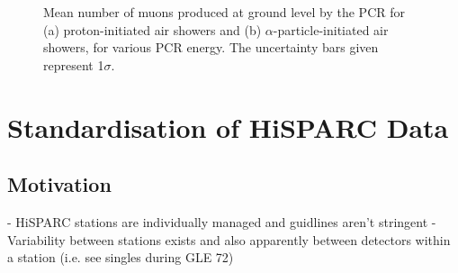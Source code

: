 \begin{figure}
	\centering
	\qquad
	\caption{Mean number of muons produced at ground level by the PCR for (a) proton-initiated air showers and (b) $\alpha$-particle-initiated air showers, for various PCR energy. The uncertainty bars given represent 1$\sigma$.}
	\label{fig:shower_muons}
\end{figure}



\section{Standardisation of HiSPARC Data}\label{sec:HS_standardisation}

\subsection{Motivation}
- HiSPARC stations are individually managed and guidlines aren't stringent
- Variability between stations exists and also apparently between detectors within a station (i.e. see singles during GLE 72)

